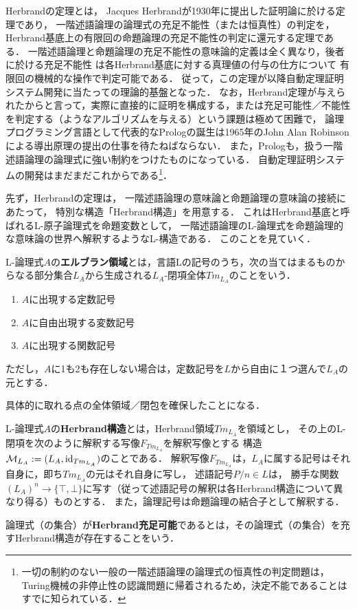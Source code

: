 \documentclass[uplatex, dvipdfmx]{jsreport}
\begin{document}
Herbrandの定理とは，
Jacques Herbrandが1930年に提出した証明論に於ける定理であり，
一階述語論理の論理式の充足不能性（または恒真性）の判定を，Herbrand基底上の有限回の命題論理の充足不能性の判定に還元する定理である．
一階述語論理と命題論理の充足不能性の意味論的定義は全く異なり，後者に於ける充足不能性
は各Herbrand基底に対する真理値の付与の仕方について
有限回の機械的な操作で判定可能である．
従って，この定理が以降自動定理証明システム開発に当たっての理論的基盤となった．
なお，Herbrand定理が与えられたからと言って，実際に直接的に証明を構成する，または充足可能性／不能性を判定する（ようなアルゴリズムを与える）という課題は極めて困難で，
論理プログラミング言語として代表的なPrologの誕生は1965年のJohn Alan Robinsonによる導出原理の提出の仕事を待たねばならない．
また，Prologも，扱う一階述語論理の論理式に強い制約をつけたものになっている．
自動定理証明システムの開発はまだまだこれからである\footnote{一切の制約のない一般の一階述語論理の論理式の恒真性の判定問題は，Turing機械の非停止性の認識問題に帰着されるため，決定不能であることはすでに知られている．}．

先ず，Herbrandの定理は，
一階述語論理の意味論と命題論理の意味論の接続にあたって，
特別な構造「Herbrand構造」を用意する．
これはHerbrand基底と呼ばれるL-原子論理式を命題変数として，
一階述語論理のL-論理式を命題論理的な意味論の世界へ解釈するようなL-構造である．
このことを見ていく．

\begin{definition}
    L-論理式$A$の\textbf{エルブラン領域}とは，言語Lの記号のうち，次の当てはまるものからなる部分集合$L_A$から生成される$L_A$-閉項全体$Tm_{L_A}$のことをいう．
    \begin{enumerate}
        \item $A$に出現する定数記号
        \item $A$に自由出現する変数記号
        \item $A$に出現する関数記号
    \end{enumerate}
    ただし，$A$に1も2も存在しない場合は，定数記号を$L$から自由に１つ選んで$L_A$の元とする．
\end{definition}
\begin{remark}
    具体的に取れる点の全体領域／閉包を確保したことになる．
\end{remark}

\begin{definition}
    L-論理式$A$の\textbf{Herbrand構造}とは，Herbrand領域$Tm_{L_A}$を領域とし，
    その上のL-閉項を次のように解釈する写像$F_{Tm_{L_A}}$を解釈写像とする
    構造$\mathcal{M}_{L_A}:=(L_A,\mathrm{id}_{Tm_{L_A}})$のことである．
    解釈写像$F_{Tm_{L_A}}$は，$L_A$に属する記号はそれ自身に，即ち$Tm_{L_A}$の元はそれ自身に写し，
    述語記号$P/n\in L$は，
    勝手な関数$(L_A)^n\to\{\top,\bot\}$に写す（従って述語記号の解釈は各Herbrand構造について異なり得る）ものとする．
    また，論理記号は命題論理の結合子として解釈する．
\end{definition}
\begin{definition}
    論理式（の集合）が\textbf{Herbrand充足可能}であるとは，その論理式（の集合）を充すHerbrand構造が存在することをいう．
\end{definition}
\end{document}
